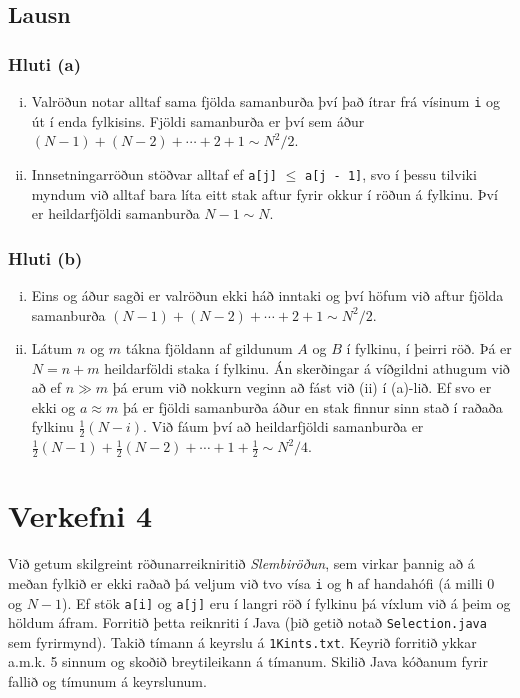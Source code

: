 \documentclass[12pt, a4paper, hidelinks]{article}
\begin{document}
\subsection*{Lausn}
\subsubsection*{Hluti (a)}
    \begin{enumerate}[(i)]
        \item Valröðun notar alltaf sama fjölda samanburða því það ítrar frá vísinum \texttt{i}
        og út í enda fylkisins. Fjöldi samanburða er því sem áður $(N - 1) + (N - 2) + \cdots + 2 + 1 \sim N^2/2$.
        \item Innsetningarröðun stöðvar alltaf ef \texttt{a[j]} $\leq$ \texttt{a[j - 1]}, svo í þessu tilviki myndum við alltaf
        bara líta eitt stak aftur fyrir okkur í röðun á fylkinu. Því er heildarfjöldi samanburða $N - 1 \sim N$.
    \end{enumerate}
\subsubsection*{Hluti (b)}
    \begin{enumerate}[(i)]
       \item Eins og áður sagði er valröðun ekki háð inntaki og því höfum við aftur fjölda samanburða $(N - 1) + (N - 2) + \cdots + 2 + 1 \sim N^2/2$.
       \item Látum $n$ og $m$ tákna fjöldann af gildunum $A$ og $B$ í fylkinu, í þeirri röð. Þá er $N = n + m$ heildarföldi staka í fylkinu. Án skerðingar á
       víðgildni athugum við að ef $n \gg m$ þá erum við nokkurn veginn að fást við (ii) í (a)-lið. Ef svo er ekki og $a \approx m$ þá er fjöldi samanburða áður
       en stak finnur sinn stað í raðaða fylkinu $\frac 12 (N - i)$. Við fáum því að heildarfjöldi samanburða er $\frac 12 (N - 1) + \frac 12 (N - 2) + \cdots + 1 + \frac 12 \sim N^2/4$.
    \end{enumerate}

\newpage

\section*{Verkefni 4}
Við getum skilgreint röðunarreikniritið \emph{Slembiröðun}, sem virkar þannig að á meðan fylkið
er ekki raðað þá veljum við tvo vísa \texttt{i} og \texttt{h} af handahófi (á milli $0$ og $N - 1$). Ef
stök \texttt{a[i]} og \texttt{a[j]} eru í langri röð í fylkinu þá víxlum við á þeim og höldum áfram. Forritið
þetta reiknriti í Java (þið getið notað \texttt{Selection.java} sem fyrirmynd). Takið tímann á keyrslu á \texttt{1Kints.txt}.
Keyrið forritið ykkar a.m.k. 5 sinnum og skoðið breytileikann á tímanum. Skilið Java kóðanum fyrir fallið og tímunum á keyrslunum.
\end{document}
